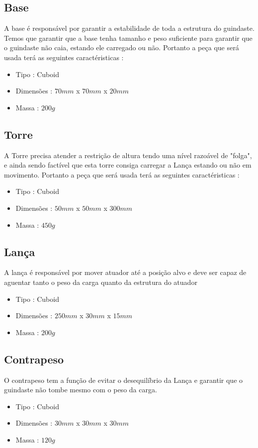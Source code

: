 \documentclass[letterpaper, 10 pt]{ieeeconf}  %
\begin{document}
    \subsection{Base}
        A base é responsável por garantir a estabilidade de toda a estrutura do guindaste. Temos que garantir 
        que a base tenha tamanho e peso suficiente para garantir que o guindaste não caia, estando ele 
        carregado ou não. Portanto a peça que será usada terá as seguintes caractéristicas :
        \begin{itemize}
            \item Tipo : Cuboid
            \item Dimensões : \(70mm\) x \(70mm\) x \(20mm\)
            \item Massa : \(200g\)
        \end{itemize}
    \subsection{Torre}
        A Torre precisa atender a restrição de altura tendo uma nível razoável de "folga", e ainda sendo factível 
        que esta torre consiga carregar a Lança estando ou não em movimento. Portanto a peça que será usada terá 
        as seguintes caractéristicas :
        \begin{itemize}
            \item Tipo : Cuboid
            \item Dimensões : \(50mm\) x \(50mm\) x \(300mm\)
            \item Massa : \(450g\)
        \end{itemize}
    \subsection{Lança}
        A lança é responsável por mover atuador até a posição alvo e deve ser capaz de aguentar tanto o 
        peso da carga quanto da estrutura do atuador
        \begin{itemize}
            \item Tipo : Cuboid
            \item Dimensões : \(250mm\) x \(30mm\) x \(15mm\)
            \item Massa : \(200g\)
        \end{itemize}
    \subsection{Contrapeso}
        O contrapeso tem a função de evitar o desequilíbrio da Lança e garantir que o guindaste 
        não tombe mesmo com o peso da carga. 
        \begin{itemize}
            \item Tipo : Cuboid
            \item Dimensões : \(30mm\) x \(30mm\) x \(30mm\)
            \item Massa : \(120g\)
        \end{itemize}
\end{document}
